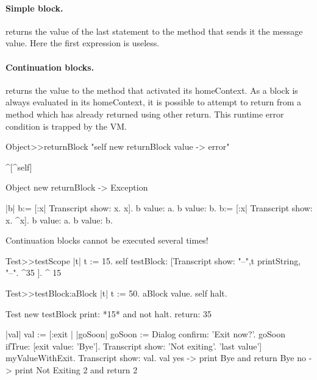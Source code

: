 \documentclass[a4paper,10pt,twoside]{book}
\begin{document}
\paragraph{Simple block.} \ct{[:x :y| x*x. x+y]} returns the value of the last statement to the method that sends it the message value. Here the first expression is useless.

\paragraph{Continuation blocks.} \ct{[:x :y| x*x. ^ x + y]} returns the value to the method that activated its homeContext. As a block is always evaluated in its homeContext, it is possible to attempt to return from a method which has already returned using other return. This runtime error condition is trapped by the VM.

\begin{code}{}
Object>>returnBlock
	"self new returnBlock value -> error"

	^[^self]

Object new returnBlock
-> Exception
\end{code}	
	
	
\begin{code}{}
|b| 
b:= [:x| Transcript show: x. x].
b value: a. b value: b.
b:= [:x| Transcript show: x. ^x].
b value: a. b value: b.
\end{code}
 
Continuation blocks cannot be executed several times!

\begin{code}{}
Test>>testScope
	   |t|
    	t := 15.
	   self testBlock: [Transcript show: "--",t printString, "--".
	   ^35 ].
    ^ 15

Test>>testBlock:aBlock
	   |t|
	   t := 50.
	   aBlock value.
	   self halt.
\end{code}

\begin{code}{}
Test new testBlock 	
print: *15* and not halt. 
return: 35
\end{code}


\begin{code}{}
|val|
val := [:exit |
		|goSoon|
		goSoon := Dialog confirm: 'Exit now?'.
		goSoon ifTrue: [exit value: 'Bye'].
		Transcript show: 'Not exiting'.
		'last value'] myValueWithExit.
Transcript show: val.
val
yes -> print Bye and return  Bye
no -> print Not Exiting 2 and return 2
\end{code}
\end{document}
